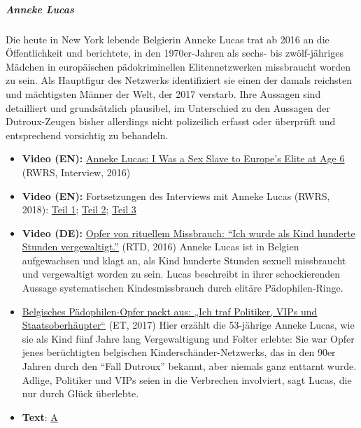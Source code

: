 \hypertarget{anneke-lucas}{%
\subparagraph{\texorpdfstring{\textbf{Anneke
Lucas}}{Anneke Lucas}}\label{anneke-lucas}}

Die heute in New York lebende Belgierin Anneke Lucas trat ab 2016 an die
Öffentlichkeit und berichtete, in den 1970er-Jahren als sechs- bis
zwölf-jähriges Mädchen in europäischen pädokriminellen Elitennetzwerken
missbraucht worden zu sein. Als Hauptfigur des Netzwerks identifiziert
sie einen der damals reichsten und mächtigsten Männer der Welt, der 2017
verstarb. Ihre Aussagen sind detailliert und grundsätzlich plausibel, im
Unterschied zu den Aussagen der Dutroux-Zeugen bisher allerdings nicht
polizeilich erfasst oder überprüft und entsprechend vorsichtig zu
behandeln.

\begin{itemize}
\tightlist
\item
  \textbf{Video (EN):}
  \href{https://www.youtube.com/watch?v=zQFOrwyFopA}{Anneke Lucas: I Was
  a Sex Slave to Europe's Elite at Age 6} (RWRS, Interview, 2016)
\item
  \textbf{Video (EN):} Fortsetzungen des Interviews mit Anneke Lucas
  (RWRS, 2018): \href{https://www.youtube.com/watch?v=3jrLFzGb2tM}{Teil
  1}; \href{https://www.youtube.com/watch?v=piaLOnNFLgw}{Teil 2};
  \href{https://www.youtube.com/watch?v=XOE4R7P72bk}{Teil 3}
\item
  \textbf{Video (DE):}
  \href{https://www.youtube.com/watch?v=hWIkneS9vQQ}{Opfer von rituellem
  Missbrauch: ``Ich wurde als Kind hunderte Stunden vergewaltigt.''}
  (RTD, 2016) Anneke Lucas ist in Belgien aufgewachsen und klagt an, als
  Kind hunderte Stunden sexuell missbraucht und vergewaltigt worden zu
  sein. Lucas beschreibt in ihrer schockierenden Aussage systematischen
  Kindesmissbrauch durch elitäre Pädophilen-Ringe.
\item
  \href{https://www.epochtimes.de/politik/europa/belgisches-paedophilen-opfer-packt-aus-ich-traf-politiker-vips-und-staatsoberhaeupter-a2032991.html}{Belgisches
  Pädophilen-Opfer packt aus: „Ich traf Politiker, VIPs und
  Staatsoberhäupter``} (ET, 2017) Hier erzählt die 53-jährige Anneke
  Lucas, wie sie als Kind fünf Jahre lang Vergewaltigung und Folter
  erlebte: Sie war Opfer jenes berüchtigten belgischen
  Kinderschänder-Netzwerks, das in den 90er Jahren durch den ``Fall
  Dutroux'' bekannt, aber niemals ganz enttarnt wurde. Adlige, Politiker
  und VIPs seien in die Verbrechen involviert, sagt Lucas, die nur durch
  Glück überlebte.
\item
  \textbf{Text}:
  \href{https://web.archive.org/web/20190720020603/https://annekelucas.com/writing/2018/8/22/a-little-spy}{A
}
\end{itemize}
